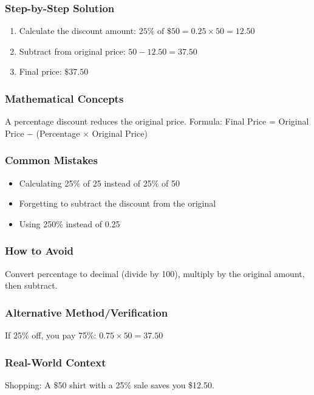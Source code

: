 \documentclass[12pt,a4paper]{article}
\begin{document}
\subsubsection*{Step-by-Step Solution}
\begin{enumerate}
    \item Calculate the discount amount: $25\% \text{ of } \$50 = 0.25 \times 50 = 12.50$
    \item Subtract from original price: $50 - 12.50 = 37.50$
    \item Final price: $\$37.50$
\end{enumerate}

\subsubsection*{Mathematical Concepts}
A percentage discount reduces the original price. Formula: Final Price = Original Price $-$ (Percentage $\times$ Original Price)

\subsubsection*{Common Mistakes}
\begin{itemize}
    \item Calculating 25\% of 25 instead of 25\% of 50
    \item Forgetting to subtract the discount from the original
    \item Using 250\% instead of 0.25
\end{itemize}

\subsubsection*{How to Avoid}
Convert percentage to decimal (divide by 100), multiply by the original amount, then subtract.

\subsubsection*{Alternative Method/Verification}
If 25\% off, you pay 75\%: $0.75 \times 50 = 37.50$ 

\subsubsection*{Real-World Context}
Shopping: A \$50 shirt with a 25\% sale saves you \$12.50.

\vspace{0.5cm}
\end{document}

